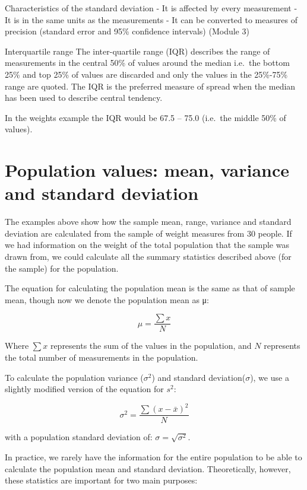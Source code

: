 \documentclass[
]{memoir}
\begin{document}
Characteristics of the standard deviation
- It is affected by every measurement
- It is in the same units as the measurements
- It can be converted to measures of precision (standard error and 95\% confidence intervals) (Module 3)

Interquartile range
The inter-quartile range (IQR) describes the range of measurements in the central 50\% of values around the median i.e.~the bottom 25\% and top 25\% of values are discarded and only the values in the 25\%-75\% range are quoted. The IQR is the preferred measure of spread when the median has been used to describe central tendency.

In the weights example the IQR would be 67.5 -- 75.0 (i.e.~the middle 50\% of values).

\hypertarget{population-values-mean-variance-and-standard-deviation}{%
\section{Population values: mean, variance and standard deviation}\label{population-values-mean-variance-and-standard-deviation}}

The examples above show how the sample mean, range, variance and standard deviation are calculated from the sample of weight measures from 30 people. If we had information on the weight of the total population that the sample was drawn from, we could calculate all the summary statistics described above (for the sample) for the population.

The equation for calculating the population mean is the same as that of sample mean, though now we denote the population mean as μ:

\[ \mu = \frac{\sum{x}}{N} \]

Where \(\sum{x}\) represents the sum of the values in the population, and \(N\) represents the total number of measurements in the population.

To calculate the population variance (\(\sigma^2\)) and standard deviation(\(\sigma\)), we use a slightly modified version of the equation for \(s^2\):

\[ \sigma^2 = \frac{\sum(x - \bar{x})^2}{N} \]

with a population standard deviation of: \(\sigma = \sqrt{\sigma^2}\).

In practice, we rarely have the information for the entire population to be able to calculate the population mean and standard deviation. Theoretically, however, these statistics are important for two main purposes:
\end{document}
